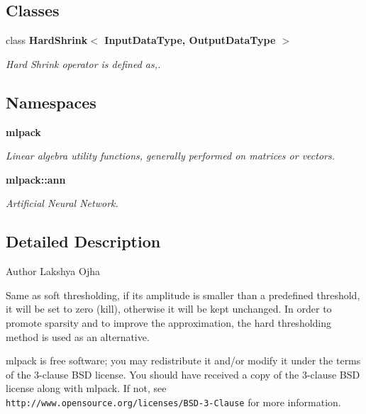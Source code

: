 \subsection*{Classes}
\begin{DoxyCompactItemize}
\item 
class \textbf{ Hard\+Shrink$<$ Input\+Data\+Type, Output\+Data\+Type $>$}
\begin{DoxyCompactList}\small\item\em Hard Shrink operator is defined as,. \end{DoxyCompactList}\end{DoxyCompactItemize}
\subsection*{Namespaces}
\begin{DoxyCompactItemize}
\item 
 \textbf{ mlpack}
\begin{DoxyCompactList}\small\item\em Linear algebra utility functions, generally performed on matrices or vectors. \end{DoxyCompactList}\item 
 \textbf{ mlpack\+::ann}
\begin{DoxyCompactList}\small\item\em Artificial Neural Network. \end{DoxyCompactList}\end{DoxyCompactItemize}


\subsection{Detailed Description}
\begin{DoxyAuthor}{Author}
Lakshya Ojha
\end{DoxyAuthor}
Same as soft thresholding, if its amplitude is smaller than a predefined threshold, it will be set to zero (kill), otherwise it will be kept unchanged. In order to promote sparsity and to improve the approximation, the hard thresholding method is used as an alternative.

mlpack is free software; you may redistribute it and/or modify it under the terms of the 3-\/clause B\+SD license. You should have received a copy of the 3-\/clause B\+SD license along with mlpack. If not, see {\tt http\+://www.\+opensource.\+org/licenses/\+B\+S\+D-\/3-\/\+Clause} for more information. 